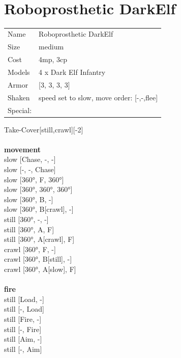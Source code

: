 { 
\ \\













\clearpage

\section{ Roboprosthetic DarkElf }

\begin{tabular}{ll}
  Name & Roboprosthetic DarkElf \\
  Size & medium\\
  Cost & 4mp, 3cp\\
  Models & 4 x Dark Elf Infantry\\
  Armor & [3, 3, 3, 3]\\
  Shaken & speed set to slow, move order: [-,-,flee]\\
  Special: \\
\end{tabular}

\noindent Take-Cover[still,crawl][-2]\\ 


\ \\ {\bf movement } \\
slow [Chase, -, -] \\
slow [-, -, Chase] \\
slow [360°, F, 360°] \\
slow [360°, 360°, 360°] \\
slow [360°, B, -] \\
slow [360°, B[crawl], -] \\
still [360°, -, -] \\
still [360°, A, F] \\
still [360°, A[crawl], F] \\
crawl [360°, F, -] \\
crawl [360°, B[still], -] \\
crawl [360°, A[slow], F] \\
\ \\ {\bf fire } \\
still [Load, -] \\
still [-, Load] \\
still [Fire, -] \\
still [-, Fire] \\
still [Aim, -] \\
still [-, Aim] \\


}
